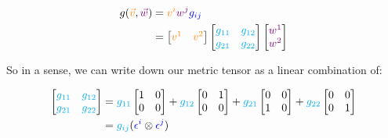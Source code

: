 \begin{align*}
    g(\begingroup\color{orange}\vec{v}\endgroup, \begingroup\color{violet}\vec{w}\endgroup) &= 
    \begingroup\color{orange}v^i\endgroup\begingroup\color{violet}w^j\endgroup
    \begingroup\color{blue}g_{ij}\endgroup\\
    &= \begin{bmatrix}
        \begingroup\color{orange}v^1\endgroup & \begingroup\color{orange}v^2\endgroup
    \end{bmatrix}
    \begin{bmatrix}
        \begingroup\color{cyan}g_{11}\endgroup & \begingroup\color{cyan}g_{12}\endgroup\\
        \begingroup\color{cyan}g_{21}\endgroup & \begingroup\color{cyan}g_{22}\endgroup
    \end{bmatrix}
    \begin{bmatrix}
        \begingroup\color{violet}w^1\endgroup \\
        \begingroup\color{violet}w^2\endgroup
    \end{bmatrix}
\end{align*}

So in a sense, we can write down our metric tensor as a linear combination of:

\begin{align*}
    \begin{bmatrix}
        \begingroup\color{cyan}g_{11}\endgroup & \begingroup\color{cyan}g_{12}\endgroup\\
        \begingroup\color{cyan}g_{21}\endgroup & \begingroup\color{cyan}g_{22}\endgroup
    \end{bmatrix} &= 
    \begingroup\color{cyan}g_{11}\endgroup 
    \begin{bmatrix}
        1 & 0\\
        0 & 0
    \end{bmatrix} +
    \begingroup\color{cyan}g_{12}\endgroup 
    \begin{bmatrix}
        0 & 1\\
        0 & 0
    \end{bmatrix} + 
    \begingroup\color{cyan}g_{21}\endgroup 
    \begin{bmatrix}
        0 & 0\\
        1 & 0
    \end{bmatrix} + 
    \begingroup\color{cyan}g_{22}\endgroup 
    \begin{bmatrix}
        0 & 0\\
        0 & 1
    \end{bmatrix} \\&= 
    \begingroup\color{cyan}g_{ij}\endgroup 
    (\begingroup\color{blue}\epsilon^i\endgroup \otimes \begingroup\color{blue}\epsilon^j\endgroup)
\end{align*}

